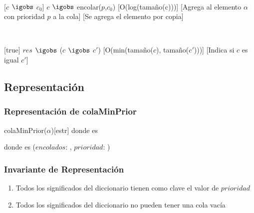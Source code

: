 	~

	[$c$ $\igobs$ $c_0$]
	{$c$ $\igobs$ encolar($p$,$c_0$)}
	[O(log(tamaño(c)))]
	[Agrega al elemento $\alpha$ con prioridad $p$ a la cola]
	[Se agrega el elemento por copia]

	~

	[true]
	{$res$ $\igobs$ ($c$ $\igobs$ $c'$)}
	[O(min(tamaño($c$), tamaño($c'$)))]
	[Indica si $c$ es igual $c'$]

\subsection{Representación}

	\subsubsection{Representación de colaMinPrior}

		\begin{Estructura}{colaMinPrior($\alpha$)}[estr]
			\- \- \- \- donde  es 

			\- \- \- \- donde  es
			($encolados$: ,
			$prioridad$: )
		\end{Estructura}

	\subsubsection{Invariante de Representación}

		\renewcommand{\labelenumi}{(\Roman{enumi})}

		\begin{enumerate}
			\item Todos los significados del diccionario tienen como clave
			el valor de $prioridad$
			\item Todos los significados del diccionario no pueden tener una
			cola vacía
		\end{enumerate}


	\mbox{}

